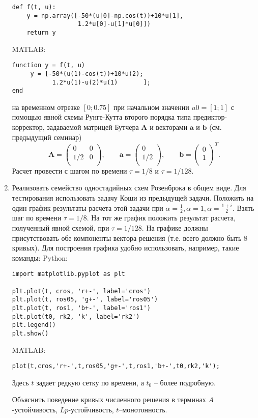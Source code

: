 \documentclass{article}
\begin{document}
\begin{enumerate}
\begin{verbatim}
def f(t, u):
    y = np.array([-50*(u[0]-np.cos(t))+10*u[1], 
                  1.2*u[0]-u[1]*u[0]])
    return y
\end{verbatim}
MATLAB:
\begin{matlablisting}
	\begin{verbatim}
function y = f(t, u)
     y = [-50*(u(1)-cos(t))+10*u(2); 
           1.2*u(1)-u(2)*u(1)       ];
end		
	\end{verbatim}
\end{matlablisting}
на временном отрезке $[0; 0.75]$
при начальном значении $u0 = [1; 1]$ с помощью явной схемы Рунге-Кутта второго порядка типа предиктор-корректор, задаваемой матрицей Бутчера $\mathbf{A}$ и векторами $\mathbf{a}$ и $\mathbf{b}$ (см. предыдущий семинар)
\begin{equation} \nonumber
	\mathbf{A} = 
		\begin{pmatrix}
		0 & 0 \\
		1/2 & 0 \\
		\end{pmatrix},
	\qquad
	\mathbf{a} = 
		\begin{pmatrix}
		0 \\
		1/2 \\
		\end{pmatrix},
	\qquad
	\mathbf{b} = 
		\begin{pmatrix}
		0 \\
		1 \\
		\end{pmatrix}^T.
\end{equation}
Расчет провести с шагом по времени $\tau = 1/8$ и $\tau = 1/128$.
\item Реализовать семейство одностадийных схем Розенброка в общем виде. Для тестирования использовать задачу Коши из предыдущей задачи. Положить на один график результаты расчета этой задачи при $\alpha = \frac{1}{2}, \alpha = 1, \alpha = \frac{1+i}{2}$. Взять шаг по времени $\tau = 1/8$. На тот же график положить результат расчета, полученный явной схемой, при $\tau = 1/128$. На графике должны присутствовать обе компоненты вектора решения (т.е. всего должно быть 8 кривых). Для построения графика удобно использовать, например, такие команды:
\newpage
Python:
\begin{verbatim}
import matplotlib.pyplot as plt

plt.plot(t, cros, 'r+-', label='cros')
plt.plot(t, ros05, 'g+-', label='ros05')
plt.plot(t, ros1, 'b+-', label='ros1')
plt.plot(t0, rk2, 'k', label='rk2')
plt.legend()
plt.show()
\end{verbatim}
MATLAB:
\begin{matlablisting}
	\begin{verbatim}
plot(t,cros,'r+-',t,ros05,'g+-',t,ros1,'b+-',t0,rk2,'k');
	\end{verbatim}
\end{matlablisting}
Здесь $t$ задает редкую сетку по времени, а $t_0$ – более подробную. 

Объяснить поведение кривых численного решения в терминах $A$-устойчивость, $Lp$-устойчивость, $t$–монотонность.

\end{enumerate}
\end{document}
